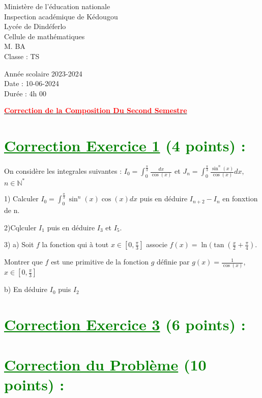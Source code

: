 \documentclass[12pt]{article}
\begin{document}
\begin{minipage}{0.5\textwidth}
	Ministère de l'éducation nationale  \\
	Inspection académique de Kédougou   \\
	Lycée de Dindéferlo            \\
	Cellule de mathématiques            \\
	M. BA                          \\
	Classe : TS  \\
\end{minipage}
\begin{minipage}{0.5\textwidth}
	Année scolaire 2023-2024 \\
	Date : 10-06-2024 \\
	Durée : 4h 00 \\
\end{minipage}

\begin{center}
	\textbf{{\underline{\textcolor{red}{Correction de la Composition Du Second Semestre}}}}
\end{center}

\section*{\textcolor{green}{\underline{Correction Exercice 1} (4 points) :}}
On considère les integrales suivantes : $I_{0}=\int_{0}^{\frac{\pi}{3}}\frac{dx}{\cos (x)}$ et $J_{n}=\int_{0}^{\frac{\pi}{3}}\frac{\sin^{n}(x)}{\cos(x)}dx,$ $n\in\mathbb{N}^{*}$

1) Calculer $I_{0}=\int_{0}^{\frac{\pi}{3}}\sin^{n}(x)\cos(x)dx$  puis en déduire $I_{n+2}-I_{n}$ en fonxtion de  n.

2)Cqlculer $I_{1}$ puis en déduire $I_{3}$ et $I_{5}$.

3) a) Soit $f$ la fonction qui à tout $x\in\left[0, \frac{\pi}{3}\right]$ associe $f(x)=\ln(\tan\left(\frac{x}{2}+\frac{\pi}{4}\right).$

Montrer que  $f$ est une primitive de la fonction $g$ définie par $g(x)=\frac{1}{\cos(x)}$, $x\in\left[0, \frac{\pi}{3}\right]$

b) En déduire $I_{0}$ puis $I_{2}$
\section*{\textcolor{green}{\underline{Correction Exercice 3} (6 points) :}}

\section*{\textcolor{green}{\underline{Correction du Problème} (10 points) :}}
\end{document}
